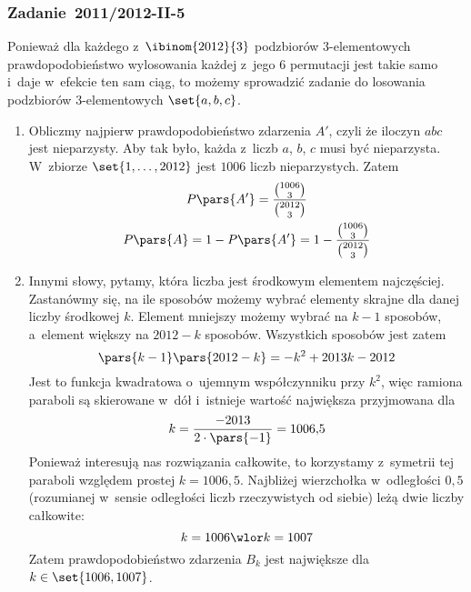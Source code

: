 \subsubsection*{Zadanie~2011/2012-II-5}
Ponieważ dla każdego z~\(\ibinom{2012}{3}\) podzbiorów \(3\)-elementowych prawdopodobieństwo wylosowania każdej z~jego \(6\) permutacji jest takie samo i~daje w~efekcie ten sam ciąg, to możemy sprowadzić zadanie do losowania podzbiorów \(3\)-elementowych \(\set{a, b, c}\).
\begin{enumerate}[label={\Alph*:}]
    \item Obliczmy najpierw prawdopodobieństwo zdarzenia \(A'\), czyli że iloczyn \(abc\) jest nieparzysty. Aby tak było, każda z~liczb \(a\), \(b\), \(c\) musi być nieparzysta. W~zbiorze \(\set{1, \ldots, 2012}\) jest \(1006\) liczb nieparzystych. Zatem
        \begin{gather*}
            P\pars{A'}
            = \frac{\binom{1006}{3}}{\binom{2012}{3}}\\
            P\pars{A}
            = 1 - P\pars{A'}
            = 1 - \frac{\binom{1006}{3}}{\binom{2012}{3}}
        \end{gather*}
    \item Innymi słowy, pytamy, która liczba jest środkowym elementem najczęściej. Zastanówmy się, na ile sposobów możemy wybrać elementy skrajne dla danej liczby środkowej \(k\). Element mniejszy możemy wybrać na \(k - 1\) sposobów, a~element większy na \(2012 - k\) sposobów. Wszystkich sposobów jest zatem
        \begin{equation*}
            \pars{k - 1}\pars{2012 - k}
            = -k^2 + 2013k - 2012
        \end{equation*}
        Jest to funkcja kwadratowa o~ujemnym współczynniku przy \(k^2\), więc ramiona paraboli są skierowane w~dół i~istnieje wartość największa przyjmowana dla
        \begin{equation*}
            k
            = \frac{-2013}{2 \cdot \pars{-1}}
            = 1006{,}5
        \end{equation*}
        Ponieważ interesują nas rozwiązania całkowite, to korzystamy z~symetrii tej paraboli względem prostej \(k = 1006{,}5\). Najbliżej wierzchołka w~odległości \(0{,}5\) (rozumianej w~sensie odległości liczb rzeczywistych od siebie) leżą dwie liczby całkowite:
        \begin{equation*}
            k = 1006 \wlor k = 1007
        \end{equation*}
        Zatem prawdopodobieństwo zdarzenia \(B_k\) jest największe dla \(k \in \set{1006, 1007}\).
\end{enumerate}
